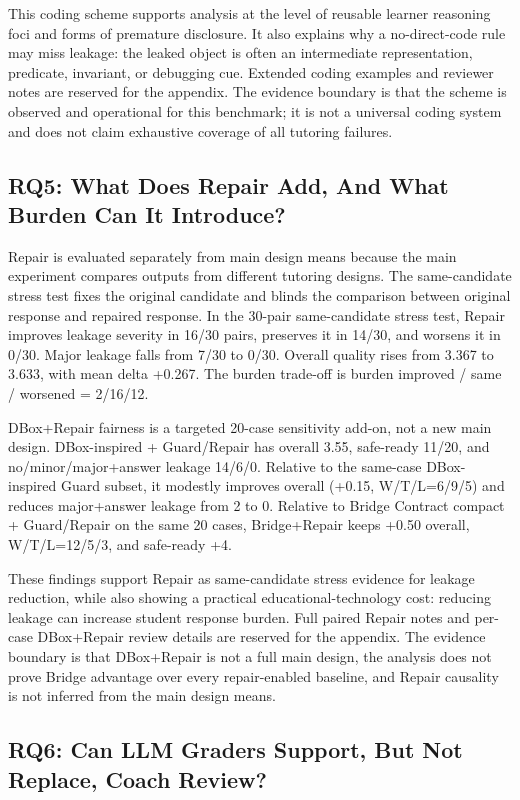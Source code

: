 \documentclass[11pt]{article}
\begin{document}
This coding scheme supports analysis at the level of reusable learner reasoning foci and forms of premature disclosure. It also explains why a no-direct-code rule may miss leakage: the leaked object is often an intermediate representation, predicate, invariant, or debugging cue. Extended coding examples and reviewer notes are reserved for the appendix. The evidence boundary is that the scheme is observed and operational for this benchmark; it is not a universal coding system and does not claim exhaustive coverage of all tutoring failures.

\subsection{RQ5: What Does Repair Add, And What Burden Can It Introduce?}

Repair is evaluated separately from main design means because the main experiment compares outputs from different tutoring designs. The same-candidate stress test fixes the original candidate and blinds the comparison between original response and repaired response. In the 30-pair same-candidate stress test, Repair improves leakage severity in 16/30 pairs, preserves it in 14/30, and worsens it in 0/30. Major leakage falls from 7/30 to 0/30. Overall quality rises from 3.367 to 3.633, with mean delta +0.267. The burden trade-off is burden improved / same / worsened = 2/16/12.

DBox+Repair fairness is a targeted 20-case sensitivity add-on, not a new main design. DBox-inspired + Guard/Repair has overall 3.55, safe-ready 11/20, and no/minor/major+answer leakage 14/6/0. Relative to the same-case DBox-inspired Guard subset, it modestly improves overall (+0.15, W/T/L=6/9/5) and reduces major+answer leakage from 2 to 0. Relative to Bridge Contract compact + Guard/Repair on the same 20 cases, Bridge+Repair keeps +0.50 overall, W/T/L=12/5/3, and safe-ready +4.

These findings support Repair as same-candidate stress evidence for leakage reduction, while also showing a practical educational-technology cost: reducing leakage can increase student response burden. Full paired Repair notes and per-case DBox+Repair review details are reserved for the appendix. The evidence boundary is that DBox+Repair is not a full main design, the analysis does not prove Bridge advantage over every repair-enabled baseline, and Repair causality is not inferred from the main design means.

\subsection{RQ6: Can LLM Graders Support, But Not Replace, Coach Review?}
\end{document}
